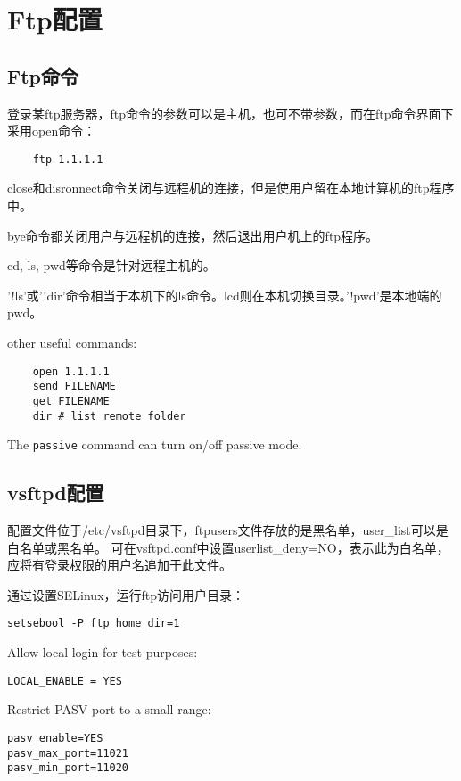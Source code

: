 \section{Ftp配置}


\subsection{Ftp命令}

登录某ftp服务器，ftp命令的参数可以是主机，也可不带参数，而在ftp命令界面下采用open命令：
\begin{lstlisting}
	ftp 1.1.1.1
\end{lstlisting}

close和disronnect命令关闭与远程机的连接，但是使用户留在本地计算机的ftp程序中。

bye命令都关闭用户与远程机的连接，然后退出用户机上的ftp程序。

cd, ls, pwd等命令是针对远程主机的。

'!ls'或'!dir'命令相当于本机下的ls命令。lcd则在本机切换目录。'!pwd'是本地端的pwd。

other useful commands:
\begin{lstlisting}
	open 1.1.1.1
	send FILENAME
	get FILENAME
	dir # list remote folder
\end{lstlisting}

The \verb|passive| command can turn on/off passive mode.



\subsection{vsftpd配置}
配置文件位于/etc/vsftpd目录下，ftpusers文件存放的是黑名单，user\_list可以是白名单或黑名单。
可在vsftpd.conf中设置userlist\_deny=NO，表示此为白名单，应将有登录权限的用户名追加于此文件。

通过设置SELinux，运行ftp访问用户目录：
\begin{lstlisting}
setsebool -P ftp_home_dir=1
\end{lstlisting}

Allow local login for test purposes:
\begin{lstlisting}
LOCAL_ENABLE = YES
\end{lstlisting}

Restrict PASV port to a small range:
\begin{lstlisting}
pasv_enable=YES
pasv_max_port=11021
pasv_min_port=11020
\end{lstlisting}



